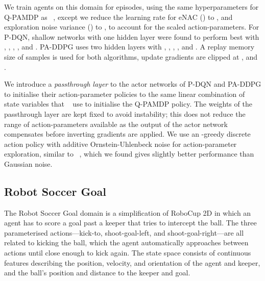 \documentclass{article}
\def\PDQN*{P\nobreakdash-DQN}
\def\QPAMDP*{Q\nobreakdash-PAMDP}
\def\PADDPG*{PA\nobreakdash-DDPG}
\newcommand{\citet}[1]
{\citeauthor{#1}~\shortcite{#1}}
\newcommand{\citep}{\cite}
\begin{document}
We train agents on this domain for  episodes, using the same hyperparameters for \QPAMDP* as \citet{masson2016}, except we reduce the learning rate for eNAC () to , and exploration noise variance () to , to account for the scaled action-parameters. For \PDQN*, shallow networks with one hidden layer  were found to perform best with , , , , and . \PADDPG* uses two hidden layers  with , , , , and . A replay memory size of  samples is used for both algorithms, update gradients are clipped at , and .

We introduce a \emph{passthrough layer} to the actor networks of \PDQN* and \PADDPG* to initialise their action-parameter policies to the same linear combination of state variables that \citet{masson2016} use to initialise the \QPAMDP* policy. The weights of the passthrough layer are kept fixed to avoid instability; this does not reduce the range of action-parameters available as the output of the actor network compensates before inverting gradients are applied. We use an -greedy discrete action policy with additive Ornstein-Uhlenbeck noise for action-parameter exploration, similar to \citet{lillicrap2015}, which we found gives slightly better performance than Gaussian noise.

\subsection{Robot Soccer Goal}
The Robot Soccer Goal domain \citep{masson2016} is a simplification of RoboCup 2D \citep{kitano1997} in which an agent has to score a goal past a keeper that tries to intercept the ball. The three parameterised actions---kick-to, shoot-goal-left, and shoot-goal-right---are all related to kicking the ball, which the agent automatically approaches between actions until close enough to kick again. The state space consists of  continuous features describing the position, velocity, and orientation of the agent and keeper, and the ball's position and distance to the keeper and goal.
\end{document}
